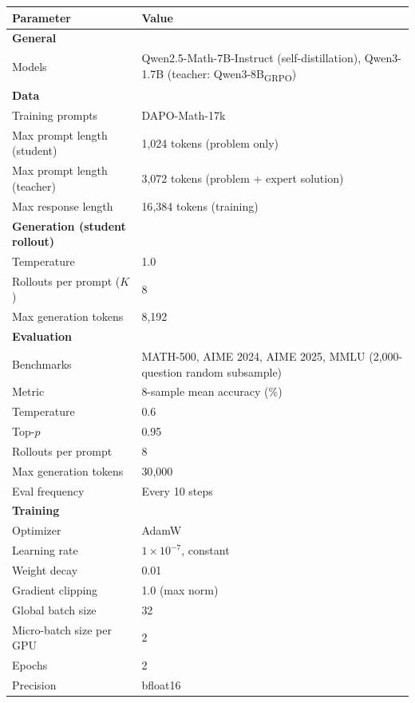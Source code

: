 \documentclass{article}
\begin{document}
\begin{table}[ht]
\renewcommand{\arraystretch}{1.15}
\centering
\setlength{\tabcolsep}{6pt}
\small
\begin{tabular}{ll}
  \toprule
  \textbf{Parameter} & \textbf{Value} \\
  \midrule
  \textbf{General} & \\
  Models & Qwen2.5-Math-7B-Instruct (self-distillation), Qwen3-1.7B (teacher: Qwen3-8B\textsubscript{GRPO}) \\
  \midrule
  \textbf{Data} & \\
  Training prompts & DAPO-Math-17k~\citep{yu2025dapo} \\
  Max prompt length (student) & 1{,}024 tokens (problem only) \\
  Max prompt length (teacher) & 3{,}072 tokens (problem + expert solution) \\
  Max response length & 16{,}384 tokens (training) \\
  \midrule
  \textbf{Generation (student rollout)} & \\
  Temperature & 1.0 \\
  Rollouts per prompt ($K$) & 8 \\
  Max generation tokens & 8{,}192 \\
  \midrule
  \textbf{Evaluation} & \\
  Benchmarks & MATH-500, AIME 2024, AIME 2025, MMLU (2{,}000-question random subsample) \\
  Metric & 8-sample mean accuracy (\%) \\
  Temperature & 0.6 \\
  Top-$p$ & 0.95 \\
  Rollouts per prompt & 8 \\
  Max generation tokens & 30{,}000 \\
  Eval frequency & Every 10 steps \\
  \midrule
  \textbf{Training} & \\
  Optimizer & AdamW \\
  Learning rate & $1 \times 10^{-7}$, constant \\
  Weight decay & 0.01 \\
  Gradient clipping & 1.0 (max norm) \\
  Global batch size & 32 \\
  Micro-batch size per GPU & 2 \\
  Epochs & 2 \\
  Precision & bfloat16 \\
  \midrule

\end{tabular}
\end{table}
\end{document}
